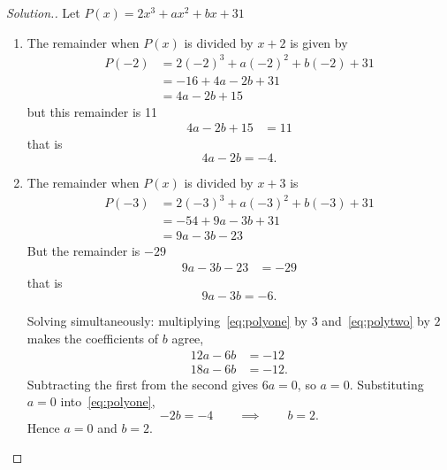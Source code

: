 \documentclass[11pt,a4paper]{article}
\theoremstyle{definition}
\newenvironment{solution}
  {\renewcommand{\qedsymbol}{}\begin{proof}[\textit{Solution}.]}
  {\end{proof}}
\begin{document}
\begin{solution}

Let $P(x)=2x^3+ax^2+bx+31$
\begin{enumerate}
\item The remainder when $P(x)$ is divided by $x+2$ is given by
\begin{align*}
P(-2) & = 2(-2)^3+a(-2)^2+b(-2)+31\\
      & = -16+4a-2b+31\\
      & = 4a-2b+15
\end{align*}
but this remainder is 11
\begin{align*}
4a-2b+15 & = 11
\end{align*}
that is
\begin{equation}\label{eq:polyone}
4a-2b=-4 .
\end{equation}

\item The remainder when $P(x)$ is divided by $x+3$ is
\begin{align*}
P(-3) & = 2(-3)^3+a(-3)^2+b(-3)+31\\
      & = -54+9a-3b+31\\
      & = 9a-3b-23
\end{align*}
But the remainder is $-29$
\begin{align*}
9a-3b-23 & = -29
\end{align*}
that is
\begin{equation}\label{eq:polytwo}
9a-3b=-6 .
\end{equation}

Solving simultaneously: multiplying~\eqref{eq:polyone} by $3$
and~\eqref{eq:polytwo} by $2$ makes the coefficients of $b$ agree,
\begin{align*}
12a-6b & = -12\\
18a-6b & = -12 .
\end{align*}
Subtracting the first from the second gives $6a=0$, so $a=0$. Substituting
$a=0$ into~\eqref{eq:polyone},
$$-2b=-4 \qquad\implies\qquad b=2 .$$
Hence $a=0$ and $b=2$.
\end{enumerate}
\end{solution}
\end{document}
